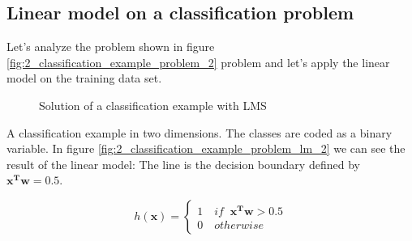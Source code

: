 \documentclass[../main.tex]{subfiles}
\begin{document}
\newpage

\subsection{Linear model on a classification problem}
Let's analyze the problem shown in figure \ref{fig:2_classification_example_problem_2} problem and let's apply the linear model on the training data set.
\begin{figure}[H]
  \centering
  \hfill
  \caption{Solution of a classification example with LMS}
\end{figure}
A classification example in two dimensions. The classes are coded as a binary variable.
In figure \ref{fig:2_classification_example_problem_lm_2} we can see the result of the linear model: The line is the decision boundary defined by $\mathbf{x^Tw} = 0.5$.

\[
    h(\textbf{x}) = \left\{
                \begin{array}{ll}
                  1 \quad if \;\; \mathbf{x^Tw}>0.5\\
                  0 \quad otherwise
                \end{array}
              \right.
\]
\end{document}
